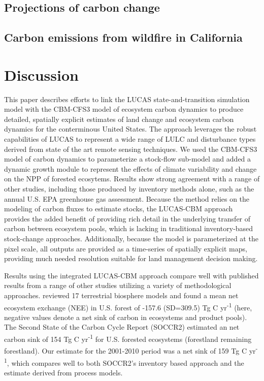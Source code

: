 \documentclass[
]{book}
\begin{document}
\hypertarget{projections-of-carbon-change}{%
\section{Projections of carbon change}\label{projections-of-carbon-change}}

\hypertarget{carbon-emissions-from-wildfire-in-california}{%
\section{Carbon emissions from wildfire in California}\label{carbon-emissions-from-wildfire-in-california}}

\hypertarget{discussion}{%
\chapter{Discussion}\label{discussion}}

This paper describes efforts to link the LUCAS state-and-transition simulation model with the CBM-CFS3 model of ecosystem carbon dynamics to produce detailed, spatially explicit estimates of land change and ecosystem carbon dynamics for the conterminous United States. The approach leverages the robust capabilities of LUCAS to represent a wide range of LULC and disturbance types derived from state of the art remote sensing techniques. We used the CBM-CFS3 model of carbon dynamics to parameterize a stock-flow sub-model and added a dynamic growth module to represent the effects of climate variability and change on the NPP of forested ecosytems. Results show strong agreement with a range of other studies, including those produced by inventory methods alone, such as the annual U.S. EPA greenhouse gas assessment. Because the method relies on the modeling of carbon fluxes to estimate stocks, the LUCAS-CBM approach provides the added benefit of providing rich detail in the underlying transfer of carbon between ecosystem pools, which is lacking in traditional inventory-based stock-change approaches. Additionally, because the model is parameterized at the pixel scale, all outputs are provided as a time-series of spatially explicit maps, providing much needed resolution suitable for land management decision making.

Results using the integrated LUCAS-CBM approach compare well with published results from a range of other studies utilizing a variety of methodological approaches. \citet{hayes2012reconciling} reviewed 17 terrestrial biosphere models and found a mean net ecosystem exchange (NEE) in U.S. forest of -157.6 (SD=309.5) Tg C yr\textsuperscript{-1} (here, negative values denote a net sink of carbon in ecosystems and product pools). The Second State of the Carbon Cycle Report (SOCCR2) estimated an net carbon sink of 154 Tg C yr\textsuperscript{-1} for U.S. forested ecosystems (forestland remaining forestland). Our estimate for the 2001-2010 period was a net sink of 159 Tg C yr\textsuperscript{-1}, which compares well to both SOCCR2's inventory based approach and the estimate derived from process models.
\end{document}
